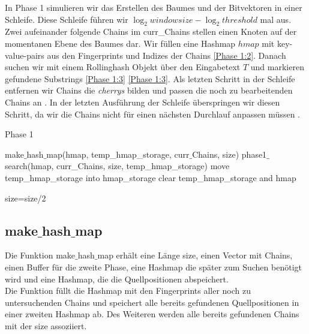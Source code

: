 \noindent
In  Phase 1 simulieren wir das Erstellen des Baumes und der Bitvektoren in einer Schleife. Diese Schleife führen wir $\log_2{windowsize}-\log_2{threshold}$ mal aus. Zwei aufeinander folgende Chains im curr\_Chains stellen einen Knoten auf der momentanen Ebene des Baumes dar.
Wir füllen eine Hashmap $hmap$ mit key-value-pairs aus den Fingerprints und Indizes der Chains \autoref{Phase 1:2}.
Danach suchen wir mit einem Rollinghash Objekt über den Eingabetext $T$ und markieren gefundene Substrings \ref{Phase 1:3} \autoref{Phase 1:3}.
Als letzten Schritt in der Schleife entfernen wir Chains die \textit{cherrys} bilden und passen die noch zu bearbeitenden Chains an .
In der letzten Ausführung der Schleife überspringen wir diesen Schritt, da wir die Chains nicht für einen nächsten Durchlauf anpassen müssen . 
\begin{algorithm}[h!]
	\caption{Phase 1}
	\label{Phase 1}
	{
		make$\_$hash$\_$map(hmap, temp\_hmap\_storage, curr$\_$Chains, size)\;\label{Phase 1:2}
		phase1$\_$search(hmap, curr\_Chains, size,
		temp\_hmap\_storage)\;\label{Phase 1:3}
		move temp\_hmap\_storage into hmap\_storage\;
		clear temp\_hmap\_storage and hmap\;
		
		size=size/2\;
	}
\end{algorithm}

\subsection{make$\_$hash$\_$map}
Die Funktion make$\_$hash$\_$map erhält eine Länge size, einen Vector mit Chains, einen Buffer für die zweite Phase, eine Hashmap die später zum Suchen benötigt wird und eine Hashmap, die die Quellpositionen abspeichert.\\
Die Funktion füllt die Hashmap mit den Fingerprints aller noch zu untersuchenden Chains und speichert alle bereits gefundenen Quellpositionen in einer zweiten Hashmap ab. Des Weiteren werden alle bereits gefundenen Chains mit der size assoziiert.\\

